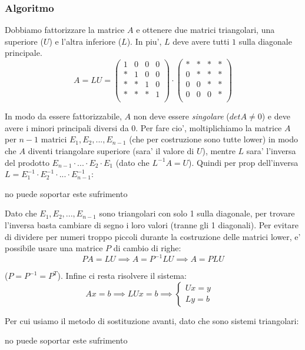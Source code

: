 \subsubsection{Algoritmo}
Dobbiamo fattorizzare la matrice $ A $ e ottenere due matrici triangolari, una superiore ($ U $) e l'altra inferiore ($ L $). In piu', $ L $ deve avere tutti $ 1 $ sulla diagonale principale. 
\[
A = LU = \begin{pmatrix}
1 & 0 & 0 & 0\\
* & 1 & 0 & 0\\
* & * & 1 & 0\\
* & * & * & 1\\
\end{pmatrix} \cdot \begin{pmatrix}
* & * & * & *\\
0 & * & * & *\\
0 & 0 & * & *\\
0 & 0 & 0 & *\\
\end{pmatrix}
\]

In modo da essere fattorizzabile, $ A $ non deve essere \textit{singolare} ($ detA \neq 0 $) e deve avere i minori principali diversi da 0. Per fare cio', moltiplichiamo la matrice $ A $ per $ n-1 $ matrici $ E_1, E_2, ..., E_{n-1} $ (che per costruzione sono tutte lower) in modo che $ A $ diventi triangolare superiore (sara' il valore di $ U $), mentre $ L $ sara' l'inversa del prodotto $ E_{n-1}\cdot ... \cdot E_2 \cdot E_1 $ (dato che $ L^{-1}A = U $). Quindi per prop dell'inversa $ L = E_1^{-1} \cdot E_2^{-1} \cdot ... \cdot E_{n-1}^{-1} $:
\begin{center}
    no puede soportar este sufrimento
\end{center}
Dato che $ E_1, E_2, ..., E_{n-1} $ sono triangolari con solo 1 sulla diagonale, per trovare l'inversa basta cambiare di segno i loro valori (tranne gli 1 diagonali). Per evitare di dividere per numeri troppo piccoli durante la costruzione delle matrici lower, e' possibile usare una matrice $ P $ di cambio di righe:
\[
PA = LU \implies A = P^{-1}LU \implies A = PLU
\]

($ P = P^{-1} = P^{T} $). Infine ci resta risolvere il sistema:
\[
Ax = b \implies LUx = b \implies \begin{cases}
Ux = y & \\
Ly = b & 
\end{cases}
\]

Per cui usiamo il metodo di sostituzione avanti, dato che sono sistemi triangolari:
\begin{center}
    no puede soportar este sufrimento
\end{center}

